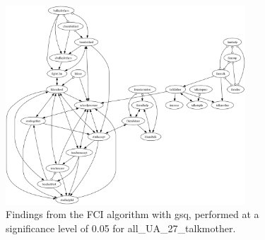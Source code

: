 \begin{figure}[htbp]
    \centering
    \includegraphics[width=0.8\textwidth]{Report/final_report/pictures/FCI_gsq_0.05_all_UA_27_talkmother.png}
    \caption{Findings from the FCI algorithm with gsq, performed at a significance level of 0.05 for all_UA_27_talkmother.}
    \label{fig:fci_gsq_0.05all_UA_27_talkmother}
\end{figure}
